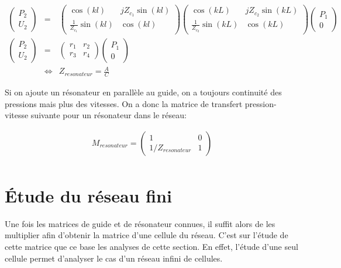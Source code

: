 \begin{eqnarray*}
\begin{pmatrix} P_2 \\U_2 \end{pmatrix} & = & \begin{pmatrix} \cos(k l) & j Z_{c_1} \sin(k l) \\ \frac{1}{Z_{c_1}} \sin(k l) & \cos(k l) \end{pmatrix} \begin{pmatrix} \cos(k L) & j Z_{c_2} \sin(k L) \\ \frac{1}{Z_{c_2}} \sin(k L) & \cos(k L) \end{pmatrix} \begin{pmatrix} P_1 \\ 0  \end{pmatrix} \\
\begin{pmatrix} P_2 \\U_2 \end{pmatrix} & = & \begin{pmatrix} r_1 & r_2 \\ r_3 & r_4 \end{pmatrix} \begin{pmatrix} P_1 \\ 0  \end{pmatrix} \\
~ & \Leftrightarrow & Z_{resonateur} = \frac{A}{C}
\end{eqnarray*}

Si on ajoute un résonateur en parallèle au guide, on a toujours continuité des pressions mais plus des vitesses. On a donc la matrice de transfert pression-vitesse suivante pour un résonateur dans le réseau:

\begin{eqnarray*}
M_{resonateur} = \begin{pmatrix} 1 &  0 \\ 1 /Z_{resonateur} & 1  \end{pmatrix}\\
\end{eqnarray*}

\section{Étude du réseau fini}

Une fois les matrices de guide et de résonateur connues, il suffit alors de les multiplier afin d'obtenir la matrice d'une cellule du réseau. C'est sur l'étude de cette matrice que ce base les analyses de cette section. En effet, l'étude d'une seul cellule permet d'analyser le cas d'un réseau infini de cellules.

